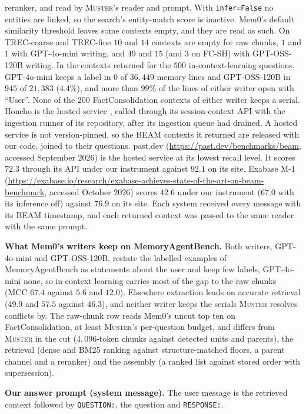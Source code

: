 \documentclass{article}
\newcommand{\sys}{\textsc{Muster}}
\begin{document}
reranker, and read by \sys{}'s reader and prompt. With \texttt{infer=False} no entities are linked, so the search's entity-match score is inactive. Mem0's default similarity threshold leaves some contexts empty, and they are read as such. On TREC-coarse and TREC-fine $10$ and $14$ contexts are empty for raw chunks, $1$ and $1$ with GPT-4o-mini writing, and $49$ and $15$ (and $3$ on FC-SH) with GPT-OSS-120B writing. In the contexts returned for the $500$ in-context-learning questions, GPT-4o-mini keeps a label in $0$ of $36{,}449$ memory lines and GPT-OSS-120B in $945$ of $21{,}383$ ($4.4\%$), and more than $99\%$ of the lines of either writer open with ``User''. None of the $200$ FactConsolidation contexts of either writer keeps a serial.
Honcho is the hosted service \cite{honcho}, called through its session-context API with the ingestion
runner of its repository, after its ingestion queue had drained. A hosted service is not version-pinned,
{\color{blue}so the BEAM contexts it returned are released with our code, joined to their questions.} past.dev (\url{https://past.dev/benchmarks/beam}, accessed September 2026) is the hosted service at
its lowest recall level. It scores $72.3$ through its API under our instrument against $92.1$ on its site. Exabase M-1 (\url{https://exabase.io/research/exabase-achieves-state-of-the-art-on-beam-benchmark}, accessed October 2026) scores $42.6$ under our instrument ($67.0$ with its inference off) against $76.9$ on its site. Each system received every message with its BEAM timestamp, and each returned
context was passed to the same reader with the same prompt.

\textbf{What Mem0's writers keep on MemoryAgentBench.} Both writers, GPT-4o-mini and GPT-OSS-120B, restate the labelled examples of MemoryAgentBench as statements about the user and keep few labels, GPT-4o-mini none, so in-context learning carries most of the gap to the raw chunks (MCC $67.4$ against $5.6$ and $12.0$). Elsewhere extraction leads on accurate retrieval ($49.9$ and $57.5$ against $46.3$), and neither writer keeps the serials \sys{} resolves conflicts by. The raw-chunk row reads Mem0's uncut top ten on FactConsolidation, at least \sys{}'s per-question budget, and differs from \sys{} in the cut ($4{,}096$-token chunks against detected units and parents), the retrieval (dense and BM25 ranking against structure-matched floors, a parent channel and a reranker) and the assembly (a ranked list against stored order with supersession).

\textbf{Our answer prompt (system message).} The user message is the retrieved context followed by \texttt{QUESTION:}, the question
and \texttt{RESPONSE:}.
\end{document}
